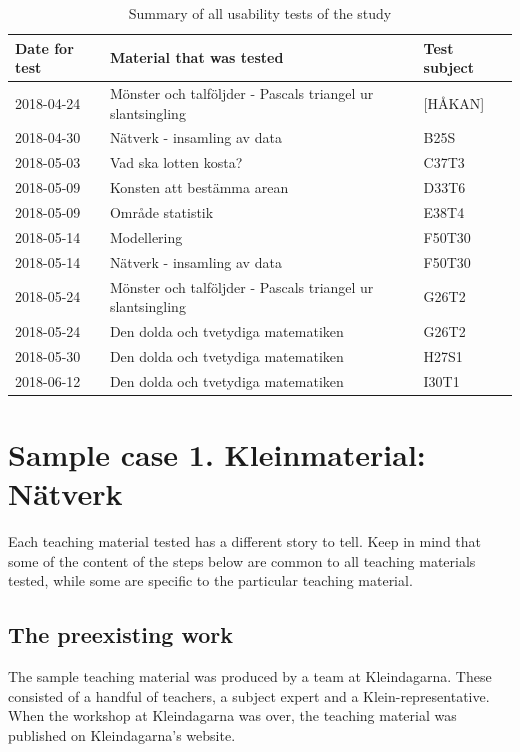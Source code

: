 \begin{table}[H]
\centering
\caption{Summary of all usability tests of the study}
\begin{tabular}{lll} \hline\hline
  Date for test & Material that was tested & Test subject \\ \hline
  2018-04-24 & Mönster och talföljder - Pascals triangel ur slantsingling & [HÅKAN] \\ \hline
  2018-04-30 & Nätverk - insamling av data & B25S \\ \hline
  2018-05-03 & Vad ska lotten kosta? & C37T3 \\ \hline
  2018-05-09 & Konsten att bestämma arean & D33T6 \\ \hline
  2018-05-09 & Område statistik & E38T4 \\ \hline
  2018-05-14 & Modellering & F50T30 \\ \hline
  2018-05-14 & Nätverk - insamling av data & F50T30 \\ \hline
  2018-05-24 & Mönster och talföljder - Pascals triangel ur slantsingling & G26T2 \\ \hline
  2018-05-24 & Den dolda och tvetydiga matematiken & G26T2 \\ \hline
  2018-05-30 & Den dolda och tvetydiga matematiken & H27S1 \\ \hline
  2018-06-12 & Den dolda och tvetydiga matematiken & I30T1
  \\ \hline\hline
\end{tabular}
\end{table}

\section{Sample case 1. Kleinmaterial: Nätverk}
Each teaching material tested has a different story to tell. Keep in mind that some of the content of the steps below are common to all teaching materials tested, while some are specific to the particular teaching material.

\subsection{The preexisting work}
The sample teaching material was produced by a team at Kleindagarna. These consisted of a handful of teachers, a subject expert and a Klein-representative. When the workshop at Kleindagarna was over, the teaching material was published on Kleindagarna's website. 

